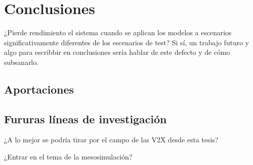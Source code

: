 \chapter{Conclusiones}
\label{ch:conclusions}

¿Pierde rendimiento el sistema cuando se aplican los modelos a escenarios significativamente diferentes de los escenarios de test? Si sí, un trabajo futuro y algo para escribbir en conclusiones sería hablar de este defecto y de cómo subsanarlo.

\section{Aportaciones}
\label{ch:conclusions:contributions}

\section{Fururas líneas de investigación}
\label{ch:conclusions:future-work}

¿A lo mejor se podría tirar por el campo de las V2X desde esta tesis?

¿Entrar en el tema de la mesosimulación?